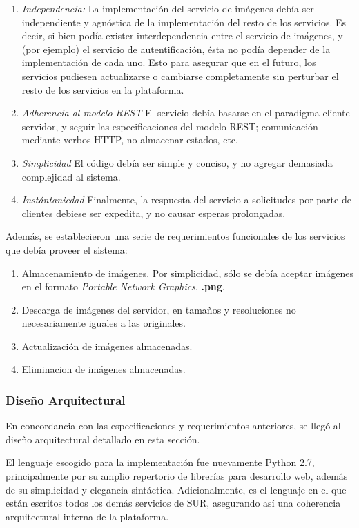 \documentclass[11pt,letterpaper]{article}
\begin{document}
\begin{enumerate}
    \item \emph{Independencia:} \@ La implementación del servicio de imágenes debía ser independiente y agnóstica de la implementación del resto de los servicios. Es decir, si bien podía exister interdependencia entre el servicio de imágenes, y (por ejemplo) el servicio de autentificación, ésta no podía depender de la implementación de cada uno. Esto para asegurar que en el futuro, los servicios pudiesen actualizarse o cambiarse completamente sin perturbar el resto de los servicios en la plataforma.
    \item \emph{Adherencia al modelo REST} \@ El servicio debía basarse en el paradigma cliente-servidor, y seguir las especificaciones del modelo REST; comunicación mediante verbos HTTP, no almacenar estados, etc.
    \item \emph{Simplicidad} \@ El código debía ser simple y conciso, y no agregar demasiada complejidad al sistema.
    \item \emph{Instántaniedad} \@ Finalmente, la respuesta del servicio a solicitudes por parte de clientes debiese ser expedita, y no causar esperas prolongadas.
\end{enumerate}

Además, se establecieron una serie de requerimientos funcionales de los servicios que debía proveer el sistema:
\begin{enumerate}
    \item Almacenamiento de imágenes. Por simplicidad, sólo se debía aceptar imágenes en el formato \emph{Portable Network Graphics}, \textbf{.png}.
    \item Descarga de imágenes del servidor, en tamaños y resoluciones no necesariamente iguales a las originales.
    \item Actualización de imágenes almacenadas.
    \item Eliminacion de imágenes almacenadas.
\end{enumerate}

\subsubsection{Diseño Arquitectural}

En concordancia con las especificaciones y requerimientos anteriores, se llegó al diseño arquitectural detallado en esta sección.

El lenguaje escogido para la implementación fue nuevamente Python 2.7, principalmente por su amplio repertorio de librerías para desarrollo web, además de su simplicidad y elegancia sintáctica. Adicionalmente, es el lenguaje en el que están escritos todos los demás servicios de SUR, asegurando así una coherencia arquitectural interna de la plataforma.
\end{document}
